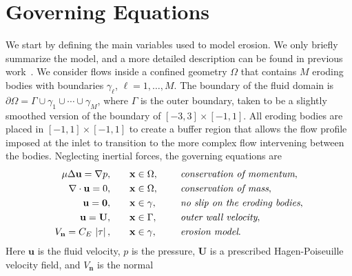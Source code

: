 \documentclass[preprint, superscriptaddress, notitlepage]{revtex4-1}
\newcommand{\bd}{{\partial}}
\newcommand{\grad}{{\nabla}}
\newcommand{\nn}{{\mathbf{n}}}
\newcommand{\uu}{{\mathbf{u}}}
\newcommand{\UU}{{\mathbf{U}}}
\newcommand{\xx}{{\mathbf{x}}}
\def\gap{\hspace*{.2in}}
\newcommand{\abs}[1]{\left| #1 \right|}
\newcommand{\Vn}{V_\nn}
\newcommand{\CE}{C_E}
\begin{document}
\section{Governing Equations}
\label{sec:formulation}
We start by defining the main variables used to model erosion.  We only
briefly summarize the model, and a more detailed description can be
found in previous work~\citep{qua-moo2018}.  We consider flows inside a
confined geometry $\Omega$ that contains $M$ eroding bodies with
boundaries $\gamma_\ell$, $\ell = 1,\ldots,M$.  The boundary of the
fluid domain is $\bd \Omega = \Gamma \cup \gamma_1 \cup \cdots \cup
\gamma_M$, where $\Gamma$ is the outer boundary, taken to be a slightly
smoothed version of the boundary of $[-3,3] \times [-1,1]$.  All eroding
bodies are placed in $[-1,1] \times [-1,1]$ to create a buffer region
that allows the flow profile imposed at the inlet to transition to the
more complex flow intervening between the bodies. Neglecting inertial
forces, the governing equations are
\begin{equation}
\label{eqn:erosionModel}
  \begin{split}
    \mu \Delta \uu = \grad p, &\hspace{20pt} \xx \in \Omega, \gap 
      &&\mbox{\em conservation of momentum}, \\
    \grad \cdot \uu = 0, &\hspace{20pt} \xx \in \Omega, \gap 
      &&\mbox{\em conservation of mass}, \\
    \uu = \mathbf{0}, &\hspace{20pt} \xx \in \gamma, \gap 
      &&\mbox{\em no slip on the eroding bodies}, \\
    \uu = \UU, &\hspace{20pt} \xx \in \Gamma, \gap 
      &&\mbox{\em outer wall velocity}, \\
    \Vn = \CE \, \abs{\tau}, &\hspace{20pt} \xx \in \gamma,
      &&\mbox{\em erosion model}.
  \end{split}
\end{equation}
Here $\uu$ is the fluid velocity, $p$ is the pressure, $\UU$ is a
prescribed Hagen-Poiseuille velocity field, and $\Vn$ is the normal
\end{document}
